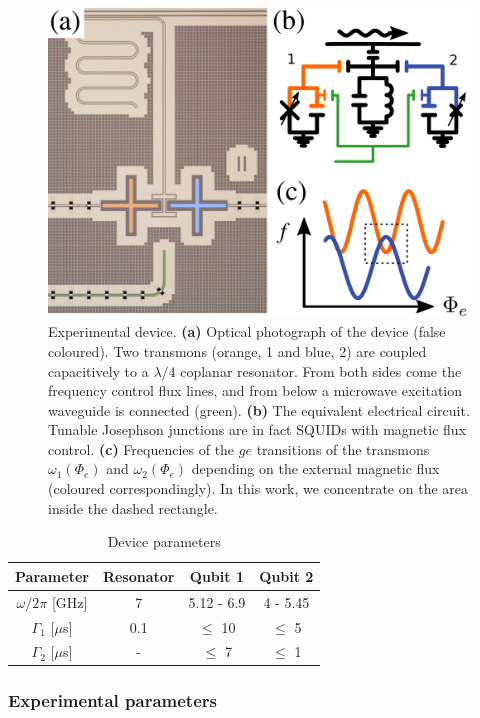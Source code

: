 \documentclass[%
 aip,
 amsmath,amssymb,
 reprint,%
]{revtex4-1}
\begin{document}
\begin{figure}
	\includegraphics[width=\linewidth]{experiment}
	\caption{Experimental device. \textbf{(a)} Optical photograph of the device (false coloured). Two transmons (orange, 1 and blue, 2) are coupled capacitively to a $\lambda/4$ coplanar resonator. From both sides come the frequency control flux lines, and from below a microwave excitation waveguide is connected (green). \textbf{(b)} The equivalent electrical circuit. Tunable Josephson junctions are in fact SQUIDs with magnetic flux control. \textbf{(c)} Frequencies of the $ge$ transitions of the transmons $\omega_1(\Phi_e)$ and $\omega_2(\Phi_e)$ depending on the external magnetic flux (coloured correspondingly). In this work, we concentrate on the area inside the dashed rectangle.}
	\label{fig:experiment}
\end{figure}


\begin{table}
	\begin{tabular}{c|c|c|c}
	Parameter & Resonator & Qubit 1 & Qubit 2\\\hline
	$\omega/2\pi$ [GHz] & 7 & 5.12 - 6.9 & 4 - 5.45\\
	$\Gamma_1$ [$\mu$s] & 0.1 & $\leq$ 10  &  $\leq$ 5\\
	$\Gamma_2$ [$\mu$s] & - & $\leq$ 7  &  $\leq$ 1
	\end{tabular}
	\caption{Device parameters}
\end{table}


\subsubsection{Experimental parameters}
\end{document}
